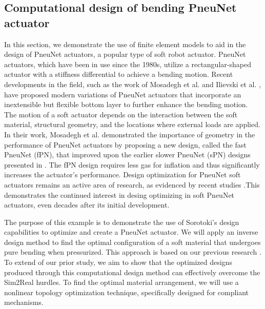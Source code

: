 \subsection{Computational design of bending PneuNet actuator}
In this section, we demonstrate the use of finite element models to aid in the design of PneuNet actuators, a popular type of soft robot actuator. PneuNet actuators, which have been in use since the 1980s, utilize a rectangular-shaped actuator with a stiffness differential to achieve a bending motion. Recent developments in the field, such as the work of Mosadegh et al. \cite{Mosadegh2014} and Ilievski et al. \cite{Ilievski2011Feb}, have proposed modern variations of PneuNet actuators that incorporate an inextensible but flexible bottom layer to further enhance the bending motion. The motion of a soft actuator depends on the interaction between the soft material, structural geometry, and the locations where external loads are applied. In their work, Mosadegh et al. \cite{Mosadegh2014} demonstrated the importance of geometry in the performance of PneuNet actuators by proposing a new design, called the fast PneuNet (fPN), that improved upon the earlier slower PneuNet (sPN) designs presented in \cite{Ilievski2011Feb}. The fPN design requires less gas for inflation and thus significantly increases the actuator's performance. Design optimization for PneuNet soft actuators remains an active area of research, as evidenced by recent studies \cite{Smith2022,Raeisinezhad2021May}.This demonstrates the continued interest in desing optimizing in soft PneuNet actuators, even decades after its initial development.

The purpose of this example is to demonstrate the use of Sorotoki's design capabilities to optimize and create a PneuNet actuator. We will apply an inverse design method to find the optimal configuration of a soft material that undergoes pure bending when pressurized. This approach is based on our previous research \cite{Caasenbrood2020May}. To extend of our prior study, we aim to show that the optimized designs produced through this computational design method can effectively overcome the Sim2Real hurdles. To find the optimal material arrangement, we will use a nonlinear topology optimization technique, specifically designed for compliant mechanisms.

